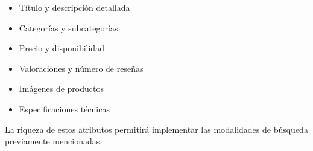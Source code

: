 \begin{itemize}
    \item Título y descripción detallada
    \item Categorías y subcategorías
    \item Precio y disponibilidad
    \item Valoraciones y número de reseñas
    \item Imágenes de productos
    \item Especificaciones técnicas
\end{itemize}

La riqueza de estos atributos permitirá implementar las modalidades de búsqueda previamente mencionadas.
